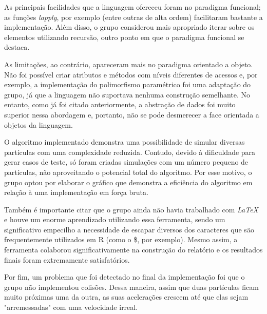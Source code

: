 \documentclass[rel_mlp]{iiufrgs}
\begin{document}
As principais facilidades que a linguagem ofereceu foram no paradigma funcional; as funções
\textit{lapply}, por exemplo (entre outras de alta ordem) facilitaram bastante a implementação.
Além disso, o grupo considerou mais apropriado iterar sobre os elementos utilizando recursão, outro ponto
em que o paradigma funcional se destaca.

As limitações, ao contrário, apareceram mais no paradigma orientado a objeto. Não foi possível
criar atributos e métodos com níveis diferentes de acessos e, por exemplo, a implementação do polimorfismo
paramétrico foi uma adaptação do grupo, já que a linguagem não suportava nenhuma construção semelhante. No
entanto, como já foi citado anteriormente, a abstração de dados foi muito superior nessa abordagem e, portanto,
não se pode desmerecer a face orientada a objetos da linguagem.

O algoritmo implementado demonstra uma possibilidade de simular diversas partículas com
uma complexidade reduzida. Contudo, devido à dificuldade para gerar casos de teste,
só foram criadas simulações com um número pequeno de partículas, não aproveitando o
potencial total do algoritmo. Por esse motivo, o grupo optou por elaborar o
gráfico que demonstra a eficiência do algoritmo em relação à uma implementação em força bruta.

Também é importante citar que o grupo ainda não havia trabalhado com \textit{LaTeX} e
houve um enorme aprendizado utilizando essa ferramenta, sendo um significativo empecilho a necessidade de
escapar diversos dos caracteres que são frequentemente utilizados em R (como o {\$}, por exemplo). Mesmo
assim, a ferramenta colaborou significativamente na construção do relatório e os resultados finais foram
extremamente satisfatórios.

Por fim, um problema que foi detectado no final da implementação foi que o grupo não implementou colisões.
Dessa maneira, assim que duas partículas ficam muito próximas uma da outra, as suas acelerações crescem até que elas sejam "arremessadas"
com uma velocidade irreal.


%



\end{document}
